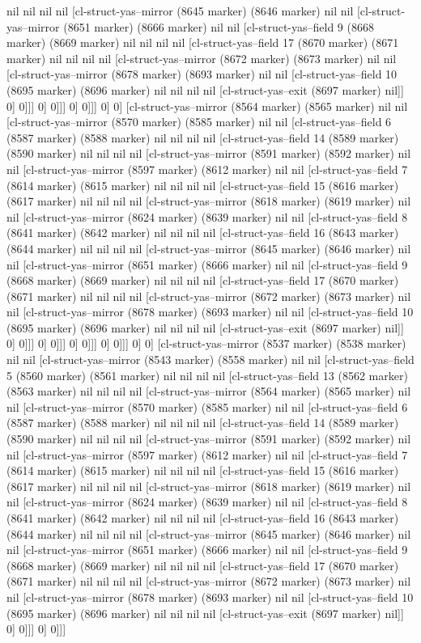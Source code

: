 {{nil nil nil nil [cl-struct-yas--mirror (8645 marker) (8646 marker) nil nil [cl-struct-yas--mirror (8651 marker) (8666 marker) nil nil [cl-struct-yas--field 9 (8668 marker) (8669 marker) nil nil nil nil [cl-struct-yas--field 17 (8670 marker) (8671 marker) nil nil nil nil [cl-struct-yas--mirror (8672 marker) (8673 marker) nil nil [cl-struct-yas--mirror (8678 marker) (8693 marker) nil nil [cl-struct-yas--field 10 (8695 marker) (8696 marker) nil nil nil nil [cl-struct-yas--exit (8697 marker) nil]] 0] 0]]] 0] 0]]] 0] 0]]] 0] 0] [cl-struct-yas--mirror (8564 marker) (8565 marker) nil nil [cl-struct-yas--mirror (8570 marker) (8585 marker) nil nil [cl-struct-yas--field 6 (8587 marker) (8588 marker) nil nil nil nil [cl-struct-yas--field 14 (8589 marker) (8590 marker) nil nil nil nil [cl-struct-yas--mirror (8591 marker) (8592 marker) nil nil [cl-struct-yas--mirror (8597 marker) (8612 marker) nil nil [cl-struct-yas--field 7 (8614 marker) (8615 marker) nil nil nil nil [cl-struct-yas--field 15 (8616 marker) (8617 marker) nil nil nil nil [cl-struct-yas--mirror (8618 marker) (8619 marker) nil nil [cl-struct-yas--mirror (8624 marker) (8639 marker) nil nil [cl-struct-yas--field 8 (8641 marker) (8642 marker) nil nil nil nil [cl-struct-yas--field 16 (8643 marker) (8644 marker) nil nil nil nil [cl-struct-yas--mirror (8645 marker) (8646 marker) nil nil [cl-struct-yas--mirror (8651 marker) (8666 marker) nil nil [cl-struct-yas--field 9 (8668 marker) (8669 marker) nil nil nil nil [cl-struct-yas--field 17 (8670 marker) (8671 marker) nil nil nil nil [cl-struct-yas--mirror (8672 marker) (8673 marker) nil nil [cl-struct-yas--mirror (8678 marker) (8693 marker) nil nil [cl-struct-yas--field 10 (8695 marker) (8696 marker) nil nil nil nil [cl-struct-yas--exit (8697 marker) nil]] 0] 0]]] 0] 0]]] 0] 0]]] 0] 0]]] 0] 0] [cl-struct-yas--mirror (8537 marker) (8538 marker) nil nil [cl-struct-yas--mirror (8543 marker) (8558 marker) nil nil [cl-struct-yas--field 5 (8560 marker) (8561 marker) nil nil nil nil [cl-struct-yas--field 13 (8562 marker) (8563 marker) nil nil nil nil [cl-struct-yas--mirror (8564 marker) (8565 marker) nil nil [cl-struct-yas--mirror (8570 marker) (8585 marker) nil nil [cl-struct-yas--field 6 (8587 marker) (8588 marker) nil nil nil nil [cl-struct-yas--field 14 (8589 marker) (8590 marker) nil nil nil nil [cl-struct-yas--mirror (8591 marker) (8592 marker) nil nil [cl-struct-yas--mirror (8597 marker) (8612 marker) nil nil [cl-struct-yas--field 7 (8614 marker) (8615 marker) nil nil nil nil [cl-struct-yas--field 15 (8616 marker) (8617 marker) nil nil nil nil [cl-struct-yas--mirror (8618 marker) (8619 marker) nil nil [cl-struct-yas--mirror (8624 marker) (8639 marker) nil nil [cl-struct-yas--field 8 (8641 marker) (8642 marker) nil nil nil nil [cl-struct-yas--field 16 (8643 marker) (8644 marker) nil nil nil nil [cl-struct-yas--mirror (8645 marker) (8646 marker) nil nil [cl-struct-yas--mirror (8651 marker) (8666 marker) nil nil [cl-struct-yas--field 9 (8668 marker) (8669 marker) nil nil nil nil [cl-struct-yas--field 17 (8670 marker) (8671 marker) nil nil nil nil [cl-struct-yas--mirror (8672 marker) (8673 marker) nil nil [cl-struct-yas--mirror (8678 marker) (8693 marker) nil nil [cl-struct-yas--field 10 (8695 marker) (8696 marker) nil nil nil nil [cl-struct-yas--exit (8697 marker) nil]] 0] 0]]] 0] 0]]] }}
